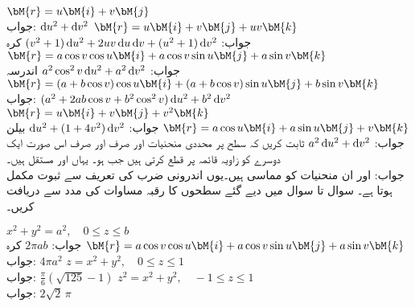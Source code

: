 \quad 
$\bM{r}=u\bM{i}+v\bM{j}$\\
جواب:\quad
$\dif u^2+\dif v^2$
\quad 
$\bM{r}=u\bM{i}+v\bM{j}+uv\bM{k}$\\
جواب:\quad
$(v^2+1)\dif u^2+2uv\dif u\dif v+(u^2+1)\dif v^2$
\quad  کرہ \quad
$\bM{r}=a\cos v \cos u\bM{i}+a\cos v \sin u\bM{j}+a\sin v\bM{k}$\\
جواب:\quad
$a^2\cos^2 v\dif u^2+a^2\dif v^2$
\quad  اندرسہ\quad
$\bM{r}=(a+b\cos v) \cos u\bM{i}+(a+b\cos v) \sin u\bM{j}+b\sin v\bM{k}$\\
جواب:\quad
$(a^2+2ab\cos v+b^2\cos^2 v)\dif u^2+b^2\dif v^2$
\quad 
$\bM{r}=u\bM{i}+v\bM{j}+v^2\bM{k}$\\
جواب:\quad
$\dif u^2+(1+4v^2)\dif v^2$
\quad  بیلن \quad
$\bM{r}=a\cos u\bM{i}+a\sin u\bM{j}+v\bM{k}$\\
جواب:\quad
$a^2\dif u^2+\dif v^2$
\quad ثابت کریں کہ سطح  پر محددی منحنیات  اور  صرف اور صرف اس صورت ایک دوسرے کو زاویہ قائمہ پر قطع کرتی ہیں جب  ہو۔  یہاں  اور  مستقل ہیں۔\\
جواب:\quad {} اور  ان منحنیات کو مماسی ہیں۔یوں اندرونی ضرب کی تعریف  سے ثبوت مکمل ہوتا ہے۔
سوال  تا سوال  میں دیے گئے سطحوں کا رقبہ مساوات  کی مدد سے دریافت کریں۔

\quad
$x^2+y^2=a^2,\quad 0\le z\le b$\\
جواب:\quad
$2\pi ab$
\quad کرہ \quad
$\bM{r}=a\cos v \cos u\bM{i}+a\cos v \sin u\bM{j}+a\sin v\bM{k}$\\
جواب:\quad
$4\pi a^2$
\quad 
$z=x^2+y^2,\quad 0\le z\le 1$\\
جواب:\quad
$\tfrac{\pi}{6}(\sqrt{125}-1)$
\quad 
$z^2=x^2+y^2,\quad -1\le z\le 1$\\
جواب:\quad
$2\sqrt{2}\,\pi$

